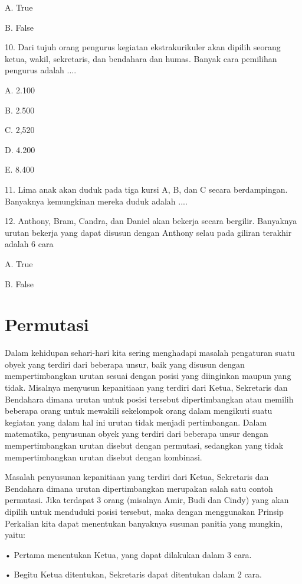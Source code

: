 \documentclass[11pt,fleqn]{book} %
\begin{document}
A. 
True

B. 
False

10. 
Dari tujuh orang pengurus kegiatan ekstrakurikuler akan dipilih seorang ketua, wakil, sekretaris, dan bendahara dan humas. Banyak cara pemilihan pengurus adalah ....

A. 
2.100

B. 
2.500

C. 
2,520

D. 
4.200

E. 
8.400

11. 
Lima anak akan duduk pada tiga kursi A, B, dan C secara berdampingan. Banyaknya kemungkinan mereka duduk adalah 
....

12. 
Anthony, Bram, Candra, dan Daniel akan bekerja secara bergilir. Banyaknya urutan bekerja yang dapat disusun dengan Anthony selau pada giliran terakhir adalah 6 cara

A. 
True

B. 
False





\section{Permutasi}
	Dalam kehidupan sehari-hari kita sering menghadapi masalah pengaturan suatu obyek yang terdiri dari beberapa unsur, baik yang disusun dengan mempertimbangkan urutan sesuai dengan posisi yang diinginkan maupun yang tidak. Misalnya menyusun kepanitiaan yang terdiri dari Ketua, Sekretaris dan Bendahara dimana urutan untuk posisi tersebut dipertimbangkan atau memilih beberapa orang untuk mewakili sekelompok orang dalam mengikuti suatu kegiatan yang dalam hal ini urutan tidak menjadi pertimbangan. Dalam matematika, penyusunan obyek yang terdiri dari beberapa unsur dengan mempertimbangkan urutan disebut dengan permutasi, sedangkan yang tidak mempertimbangkan urutan disebut dengan kombinasi.


Masalah penyusunan kepanitiaan yang terdiri dari Ketua, Sekretaris dan Bendahara dimana urutan dipertimbangkan merupakan salah satu contoh permutasi. Jika terdapat 3 orang (misalnya Amir, Budi dan Cindy) yang akan dipilih untuk menduduki posisi tersebut, maka dengan menggunakan Prinsip Perkalian kita dapat menentukan banyaknya susunan panitia yang mungkin, yaitu:


• Pertama menentukan Ketua, yang dapat dilakukan dalam 3 cara.


• Begitu Ketua ditentukan, Sekretaris dapat ditentukan dalam 2 cara.
\end{document}
